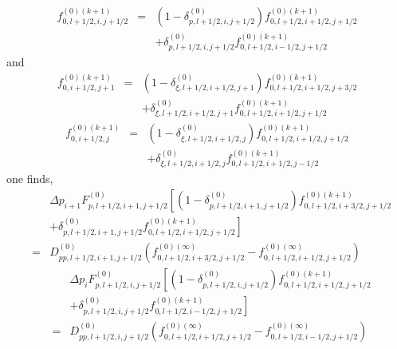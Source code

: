 \begin{eqnarray}
f_{0,l+1/2,i,j+1/2}^{\left( 0\right) (k+1)} &=&\left( 1-\delta
_{p,l+1/2,i,j+1/2}^{\left( 0\right) }\right) f_{0,l+1/2,i+1/2,j+1/2}^{\left(
0\right) (k+1)}  \nonumber \\
&&+\delta _{p,l+1/2,i,j+1/2}^{\left( 0\right)
}f_{0,l+1/2,i-1/2,j+1/2}^{\left( 0\right) (k+1)}
\end{eqnarray}
and
\begin{eqnarray}
f_{0,i+1/2,j+1}^{\left( 0\right) (k+1)} &=&\left( 1-\delta _{\xi
,l+1/2,i+1/2,j+1}^{\left( 0\right) }\right) f_{0,l+1/2,i+1/2,j+3/2}^{\left(
0\right) (k+1)}  \nonumber \\
&&+\delta _{\xi ,l+1/2,i+1/2,j+1}^{\left( 0\right)
}f_{0,l+1/2,i+1/2,j+1/2}^{\left( 0\right) (k+1)}
\end{eqnarray}
\begin{eqnarray}
f_{0,i+1/2,j}^{\left( 0\right) (k+1)} &=&\left( 1-\delta _{\xi
,l+1/2,i+1/2,j}^{\left( 0\right) }\right) f_{0,l+1/2,i+1/2,j+1/2}^{\left(
0\right) (k+1)}  \nonumber \\
&&+\delta _{\xi ,l+1/2,i+1/2,j}^{\left( 0\right)
}f_{0,l+1/2,i+1/2,j-1/2}^{\left( 0\right) (k+1)}
\end{eqnarray}
one finds,
\begin{eqnarray}
&&\Delta p_{i+1}F_{p,l+1/2,i+1,j+1/2}^{\left( 0\right) }\left[ \left(
1-\delta _{p,l+1/2,i+1,j+1/2}^{\left( 0\right) }\right)
f_{0,l+1/2,i+3/2,j+1/2}^{\left( 0\right) (k+1)}\right.  \nonumber \\
&&\left. +\delta _{p,l+1/2,i+1,j+1/2}^{\left( 0\right)
}f_{0,l+1/2,i+1/2,j+1/2}^{\left( 0\right) (k+1)}\right]  \nonumber \\
&=&D_{pp,l+1/2,i+1,j+1/2}^{\left( 0\right) }\left(
f_{0,l+1/2,i+3/2,j+1/2}^{\left( 0\right) (\infty
)}-f_{0,l+1/2,i+1/2,j+1/2}^{\left( 0\right) (\infty )}\right)
\end{eqnarray}
\begin{eqnarray}
&&\Delta p_{i}F_{p,l+1/2,i,j+1/2}^{\left( 0\right) }\left[ \left( 1-\delta
_{p,l+1/2,i,j+1/2}^{\left( 0\right) }\right) f_{0,l+1/2,i+1/2,j+1/2}^{\left(
0\right) (k+1)}\right.  \nonumber \\
&&\left. +\delta _{p,l+1/2,i,j+1/2}^{\left( 0\right)
}f_{0,l+1/2,i-1/2,j+1/2}^{\left( 0\right) (k+1)}\right]  \nonumber \\
&=&D_{pp,l+1/2,i,j+1/2}^{\left( 0\right) }\left(
f_{0,l+1/2,i+1/2,j+1/2}^{\left( 0\right) (\infty
)}-f_{0,l+1/2,i-1/2,j+1/2}^{\left( 0\right) (\infty )}\right)
\end{eqnarray}
